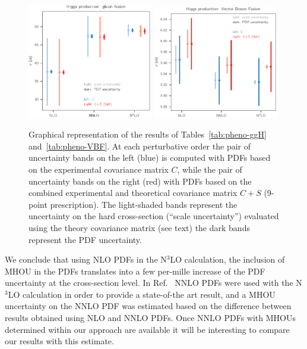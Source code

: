 \begin{figure}[t]
  \begin{center}
   \includegraphics[width=0.49\textwidth]{mhous/plots/ggHiggs.pdf}
  \includegraphics[width=0.49\textwidth]{mhous/plots/vbf.pdf}
\caption{\small Graphical
    representation of the results
    of Tables~\ref{tab:pheno-ggH} and~\ref{tab:pheno-VBF}.
At each perturbative order the pair of  uncertainty bands on the left
    (blue) is computed with PDFs
based on the  experimental covariance matrix $C$,
while the pair of  uncertainty
bands on the right (red) with  PDFs
based on the combined experimental and 
theoretical covariance matrix $C+S$ (9-point prescription).
%
The light-shaded bands represent the uncertainty on the hard cross-section 
(``scale uncertainty'') evaluated using the theory
covariance matrix (see text)
the dark bands represent the PDF uncertainty.
    \label{fig:pheno-gghiggs} }
  \end{center}
\end{figure}

We conclude that using NLO PDFs in the N$^3$LO calculation, the
inclusion of MHOU in the PDFs translates into a few 
per-mille increase of the PDF uncertainty at the cross-section level.  
In Ref.~\cite{Anastasiou:2016cez} NNLO PDFs were used with the
N$^3$LO calculation in order to provide a state-of-the art result, and
a MHOU uncertainty on the NNLO PDF was estimated based on the
difference between results obtained using NLO and NNLO PDFs. Once NNLO
PDFs with MHOUs determined within our approach are available it
will be interesting to compare our results with this estimate.

